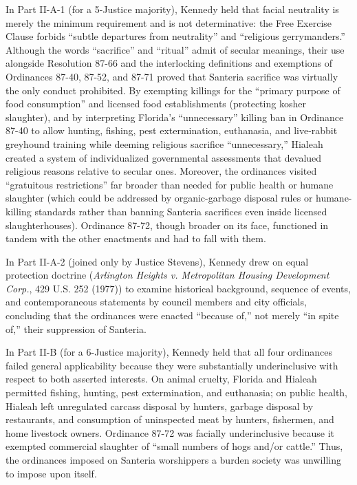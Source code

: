 \documentclass[12pt]{article}
\begin{document}
In Part II-A-1 (for a 5-Justice majority), Kennedy held that facial neutrality is merely the minimum requirement and is not determinative: the Free Exercise Clause forbids ``subtle departures from neutrality'' and ``religious gerrymanders.'' Although the words ``sacrifice'' and ``ritual'' admit of secular meanings, their use alongside Resolution 87-66 and the interlocking definitions and exemptions of Ordinances 87-40, 87-52, and 87-71 proved that Santeria sacrifice was virtually the only conduct prohibited. By exempting killings for the ``primary purpose of food consumption'' and licensed food establishments (protecting kosher slaughter), and by interpreting Florida's ``unnecessary'' killing ban in Ordinance 87-40 to allow hunting, fishing, pest extermination, euthanasia, and live-rabbit greyhound training while deeming religious sacrifice ``unnecessary,'' Hialeah created a system of individualized governmental assessments that devalued religious reasons relative to secular ones. Moreover, the ordinances visited ``gratuitous restrictions'' far broader than needed for public health or humane slaughter (which could be addressed by organic-garbage disposal rules or humane-killing standards rather than banning Santeria sacrifices even inside licensed slaughterhouses). Ordinance 87-72, though broader on its face, functioned in tandem with the other enactments and had to fall with them.

In Part II-A-2 (joined only by Justice Stevens), Kennedy drew on equal protection doctrine (\textit{Arlington Heights v. Metropolitan Housing Development Corp.}, 429 U.S. 252 (1977)) to examine historical background, sequence of events, and contemporaneous statements by council members and city officials, concluding that the ordinances were enacted ``because of,'' not merely ``in spite of,'' their suppression of Santeria.

In Part II-B (for a 6-Justice majority), Kennedy held that all four ordinances failed general applicability because they were substantially underinclusive with respect to both asserted interests. On animal cruelty, Florida and Hialeah permitted fishing, hunting, pest extermination, and euthanasia; on public health, Hialeah left unregulated carcass disposal by hunters, garbage disposal by restaurants, and consumption of uninspected meat by hunters, fishermen, and home livestock owners. Ordinance 87-72 was facially underinclusive because it exempted commercial slaughter of ``small numbers of hogs and/or cattle.'' Thus, the ordinances imposed on Santeria worshippers a burden society was unwilling to impose upon itself.
\end{document}
